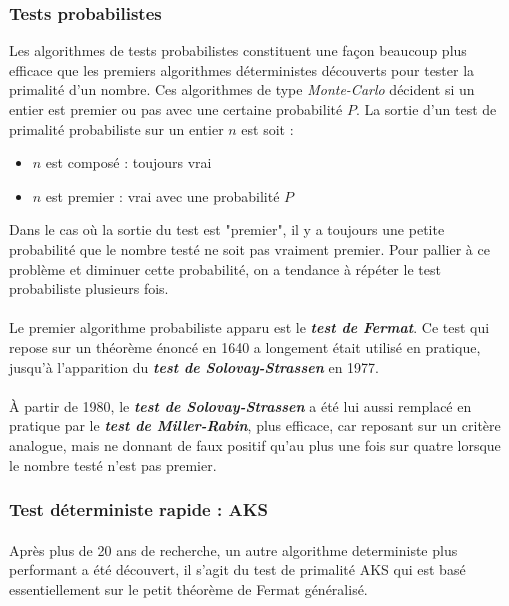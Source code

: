 		\subsubsection*{Tests probabilistes}
			Les algorithmes de tests probabilistes constituent une façon beaucoup plus efficace que les premiers algorithmes déterministes découverts pour tester la primalité d'un nombre. Ces algorithmes de type \textit{Monte-Carlo} décident si un entier est premier ou pas avec une certaine probabilité $P$. La sortie d'un test de primalité probabiliste sur un entier $n$ est soit :
			\begin{itemize}
				\item $n$ est composé : toujours vrai
				\item $n$ est premier : vrai avec une probabilité $P$
			\end{itemize}
			Dans le cas où la sortie du test est "premier", il y a toujours une petite probabilité que le nombre testé ne soit pas vraiment premier. Pour pallier à ce problème et diminuer cette probabilité, on a tendance à répéter le test probabiliste plusieurs fois.
			
			\paragraph{}Le premier algorithme probabiliste apparu est le \textit{\textbf{test de Fermat}}. Ce test qui repose sur un théorème énoncé en 1640 a longement était utilisé en pratique, jusqu'à l'apparition du \textit{\textbf{test de Solovay-Strassen}} en 1977. 
			
			\paragraph{} À partir de 1980, le \textit{\textbf{test de Solovay-Strassen}} a été lui aussi remplacé en pratique par le \textit{\textbf{test de Miller-Rabin}}, plus efficace, car reposant sur un critère analogue, mais ne donnant de faux positif qu'au plus une fois sur quatre lorsque le nombre testé n'est pas premier.
			
		\subsubsection*{Test déterministe rapide : AKS}
			\paragraph{}Après plus de 20 ans de recherche, un autre algorithme deterministe plus performant a été découvert, il s'agit du test de primalité AKS qui est basé essentiellement sur le petit théorème de Fermat généralisé.
